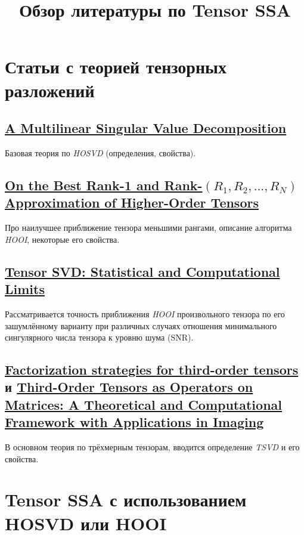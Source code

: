 \documentclass[12pt]{article}
\theoremstyle{plain}
\theoremstyle{definition}
\theoremstyle{remark}
\begin{document}
\title{Обзор литературы по Tensor SSA}
\date{}
\author{}
\maketitle
\section{Статьи с теорией тензорных разложений}
\subsection{\href{https://doi.org/10.1137/s0895479896305696}
{A Multilinear Singular Value Decomposition}}\label{DeLathauwer2000}
Базовая теория
по \emph{HOSVD} (определения, свойства).

\subsection{\href{https://doi.org/10.1137/s0895479898346995}{On the Best
    Rank-1 and Rank-\texorpdfstring{$(R_1 ,R_2 ,. . .,R_N)$}{(R1, R2,
..., RN)}    Approximation of Higher-Order Tensors}}\label{DeLathauwer2000a}
Про наилучшее приближение тензора
меньшими рангами, описание алгоритма \emph{HOOI}, некоторые его свойства.

\subsection{\href{https://doi.org/10.1109/TIT.2018.2841377}{Tensor SVD:
Statistical and Computational Limits}}
Рассматривается
точность приближения \emph{HOOI} произвольного тензора по его
зашумлённому варианту при различных случаях отношения минимального
сингулярного числа тензора к уровню шума (SNR).

\subsection{
  \href{https://doi.org/10.1016/j.laa.2010.09.020}{Factorization
  strategies for third-order tensors} и
  \href{https://doi.org/10.1137/110837711}{Third-Order
    Tensors as Operators on Matrices: A Theoretical and Computational
Framework with Applications in Imaging}}\label{Kilmer2011}
В основном теория по
трёхмерным тензорам,
вводится определение \emph{TSVD} и его свойства.

\section{Tensor SSA с использованием HOSVD или HOOI}
\end{document}
